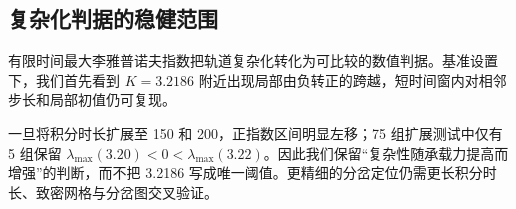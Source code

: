 \subsection{复杂化判据的稳健范围}
有限时间最大李雅普诺夫指数把轨道复杂化转化为可比较的数值判据。基准设置下，我们首先看到 $K=3.2186$ 附近出现局部由负转正的跨越，短时间窗内对相邻步长和局部初值仍可复现。

一旦将积分时长扩展至 150 和 200，正指数区间明显左移；75 组扩展测试中仅有 5 组保留 $\lambda_{\max}(3.20)<0<\lambda_{\max}(3.22)$。因此我们保留“复杂性随承载力提高而增强”的判断，而不把 3.2186 写成唯一阈值。更精细的分岔定位仍需更长积分时长、致密网格与分岔图交叉验证。

